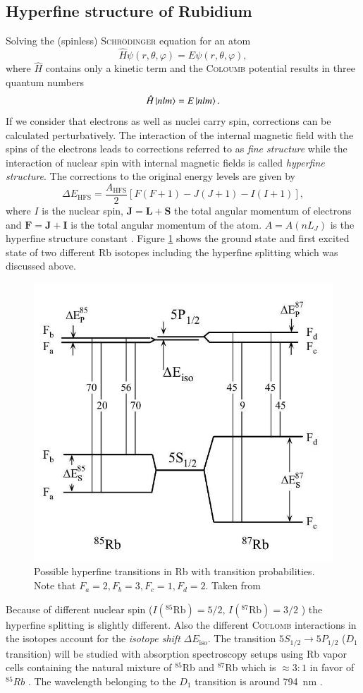 \documentclass[11pt,a4paper,notitlepage]{scrartcl}
\begin{document}
\subsection{Hyperfine structure of Rubidium}
Solving the (spinless) \textsc{Schrödinger} equation for an atom $$\hat{H}\psi(r,\theta,\varphi)=E\psi(r,\theta,\varphi),$$
where $\hat{H}$ contains only a kinetic term and the \textsc{Coloumb} potential results in three quantum numbers $$\hat{H}\ket{nlm}=E\ket{nlm}.$$
If we consider that electrons as well as nuclei carry spin, corrections can be calculated perturbatively. The interaction of the internal magnetic field with the spins of the electrons leads to corrections referred to as \emph{fine structure} while the interaction of nuclear spin with internal magnetic fields is called \emph{hyperfine structure}. The corrections to the original energy levels are given by \begin{equation}
	\label{eq:hfs}
	\Delta E_{\text{HFS}}=\frac{A_\text{HFS}}{2}\left[F(F+1)-J(J+1)-I(I+1)\right],
\end{equation}
where $I$ is the nuclear spin, $\mathbf{J}=\mathbf{L}+\mathbf{S}$ the total angular momentum of electrons and $\mathbf{F}=\mathbf{J}+\mathbf{I}$
is the total angular momentum of the atom. $A=A(nL_J)$ is the hyperfine structure constant \cite{demtröder,manual}. Figure \ref{fig:hfs} shows the ground state and first excited state of two different Rb isotopes including the hyperfine splitting which was discussed above.
\begin{figure}[htbp]
	\centering
	\includegraphics[width=.5\linewidth]{figs/experimental_setup/hfs.jpg}
	\caption{Possible hyperfine transitions in Rb with transition probabilities. Note that $F_a=2,F_b=3,F_c=1,F_d=2$. Taken from \cite{manual}}
	\label{fig:hfs}
\end{figure}
Because of different nuclear spin ($I(^{85}\text{Rb})=5/2$, $I(^{87}\text{Rb})=3/2$ \cite{85d,87d}) the hyperfine splitting is slightly different. Also the different \textsc{Coulomb} interactions in the isotopes account for the \emph{isotope shift} $\Delta E_\text{iso}$. The transition $5S_{1/2}\to5{P_{1/2}}$ ($D_1$ transition) will be studied with absorption spectroscopy setups using Rb vapor cells containing the natural mixture of $^{85}$Rb and $^{87}$Rb which is $\approx 3:1$ in favor of $^{85}Rb$ \cite{manual}. The wavelength belonging to the $D_1$ transition is around \SI{794}{\nano\m} \cite{manual}.
\end{document}
